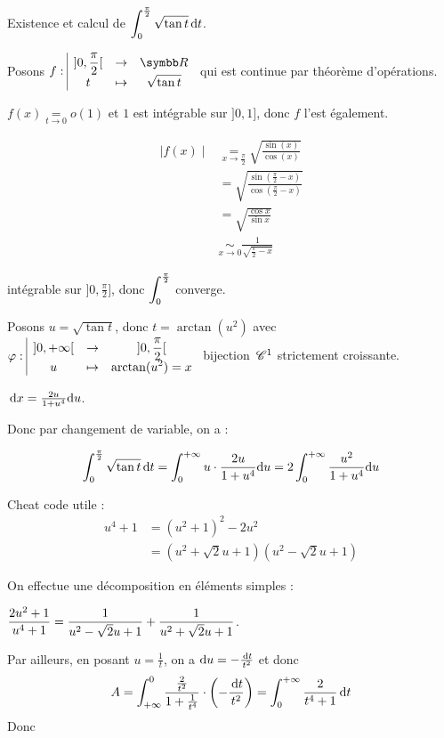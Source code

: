 \begin{exemple}
    Existence et calcul de $\displaystyle \int_0^{\frac \pi 2} \sqrt{\tan t} \,\mathrm{d}t$.

    Posons $\fonction f {]0, \frac \pi 2[}{\R}{t}{\sqrt{\tan t}}$ qui est continue par théorème d'opérations.

    $f(x) \underset{t \to 0 }{ = } o(1)$ et $1$ est intégrable sur $]0, 1]$, donc $f$ l'est également. 

    \begin{align}
        \mid f(x) \mid & \underset{x \to \frac \pi 2 }{ = } \sqrt{\frac {\sin(x)}{\cos(x)}} \\ 
        & = \sqrt{\frac{\sin(\frac \pi 2 - x)}{\cos(\frac \pi 2 - x)}} \\
        & = \sqrt{\frac{\cos x}{\sin x}} \\
        & \underset{x \to 0 }{ \sim } \frac 1 {\sqrt {\frac \pi 2 - x}}
    \end{align}

    intégrable sur $]0, \frac \pi 2]$, donc $\displaystyle \int_0^{\frac \pi 2}$ converge. 

    Posons $u = \sqrt{\tan t}$, donc $t = \arctan (u^2)$ avec 
    $\varphi: \space \begin{array}{|ccc} \displaystyle ]0, + \infty[ & \to & \displaystyle ]0, \frac \pi 2[ \\ \displaystyle u & \mapsto & \displaystyle \arctan (u^2) = x \end{array}$ bijection 
    $\,\mathscr C^{1}$ strictement croissante.

    $\,\mathrm{d}x = \frac {2u}{1 + u^4} \mathrm d u$.

    Donc par changement de variable, on a :

    $$\int_0^{\frac \pi 2} \sqrt{\tan t} \,\mathrm{d}t = \int_0^{+ \infty} u \cdot \frac{2u}{1 + u^4} \mathrm d u = 2 \int_0^{+ \infty} \frac{u^2}{1 + u^4} \mathrm d u$$

    Cheat code utile : 
    \begin{align}
        u^4 + 1 & = (u^2 + 1)^2 - 2 u^2 \\
        & = (u^2 + \sqrt 2 u + 1)(u^2 - \sqrt 2 u + 1)
    \end{align}

    On effectue une décomposition en éléments simples :

    $\displaystyle \frac{2u^2 + 1}{u^4 + 1} = \frac 1 {u^2 - \sqrt 2 u + 1} + \frac 1 {u^2 + \sqrt 2 u + 1}$.

    Par ailleurs, en posant $u = \frac 1 t$, on a $\mathrm d u = - \frac {\,\mathrm{d}t} {t^2}$ et donc 
    $$A = \int_{+ \infty  }^{0 } \frac{\frac{2 }{t^2 }}{1 + \frac{1 }{t^4 }} \cdot\left( - \frac {\,\mathrm{d}t} {t^2} \right) = \int_0^{+ \infty  } \frac{2 }{t^4 + 1 } \,\mathrm{d}t$$
    Donc 


\end{exemple}
